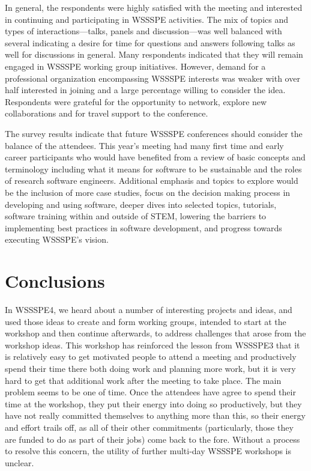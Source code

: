 \documentclass[11pt, oneside]{amsart}
\begin{document}
In general, the respondents were highly satisfied with the meeting and interested in continuing and participating in WSSSPE activities.
The mix of topics and types of interactions---talks, panels and discussion---was well balanced with several indicating a desire for time for questions and answers following talks as well for discussions in general.
Many respondents indicated that they will remain engaged in WSSSPE working group initiatives.
However, demand for a professional organization encompassing WSSSPE interests was weaker with over half interested in joining and a large percentage willing to consider the idea.
Respondents were grateful for the opportunity to network, explore new collaborations and for travel support to the conference.

The survey results indicate that future WSSSPE conferences should consider the balance of the attendees.
This year's meeting had many first time and early career participants who would have benefited from a review of basic concepts and terminology including what it means for software to be sustainable and the roles of research software engineers.
Additional emphasis and topics to explore would be the inclusion of more case studies, focus on the decision making process in developing and using software, deeper dives into selected topics, tutorials, software training within and outside of STEM, lowering the barriers to implementing best practices in software development, and progress towards executing WSSSPE's vision.

\section{Conclusions} \label{sec:conclusions}

In WSSSPE4, we heard about a number of interesting projects and ideas, and used those
ideas to create and form working groups, intended to start at the workshop and then
continue afterwards, to address challenges that arose from the workshop ideas.  This workshop
has reinforced the lesson from WSSSPE3 that it is relatively easy to get motivated people
to attend a meeting and productively spend their time there both doing work and planning
more work, but it is very hard to get that additional work after the meeting to take place.
The main problem seems to be one of time.  Once the attendees have agree to spend
their time at the workshop, they put their energy into doing so productively, but they have not
really committed themselves to anything more than this, so their energy and effort trails
off, as all of their other commitments (particularly, those they are funded to do as part of
their jobs) come back to the fore. Without a process to resolve this concern, the utility of
further multi-day WSSSPE workshops is unclear.
\end{document}
